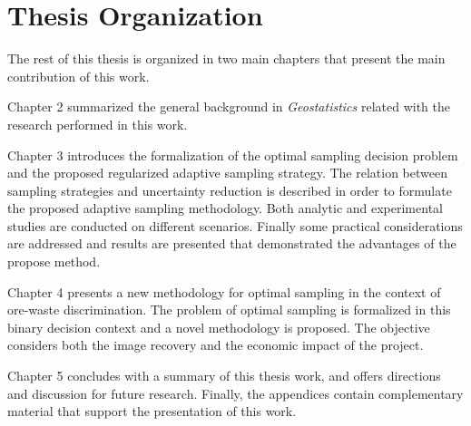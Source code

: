 \section{Thesis Organization}

The rest of this thesis is organized in two main chapters that present the main contribution of this work.

Chapter 2 summarized the general background in \emph{Geostatistics} related with the research performed in this work.

Chapter 3 introduces the formalization of the optimal sampling decision problem and the proposed regularized adaptive sampling strategy. The relation between sampling strategies and uncertainty reduction is described in order to formulate the proposed adaptive sampling methodology. Both analytic and experimental studies are conducted on different scenarios. Finally some practical considerations are addressed and results are presented that demonstrated the advantages of the propose method.

Chapter 4 presents a new methodology for optimal sampling in the context of ore-waste discrimination. The problem of optimal sampling is formalized in this binary decision context and a novel methodology is proposed. The objective considers both the image recovery and the economic impact of the project.

Chapter 5 concludes with a summary of this thesis work, and offers directions and discussion for future research. Finally, the appendices contain complementary material that support the presentation of this work.





















































